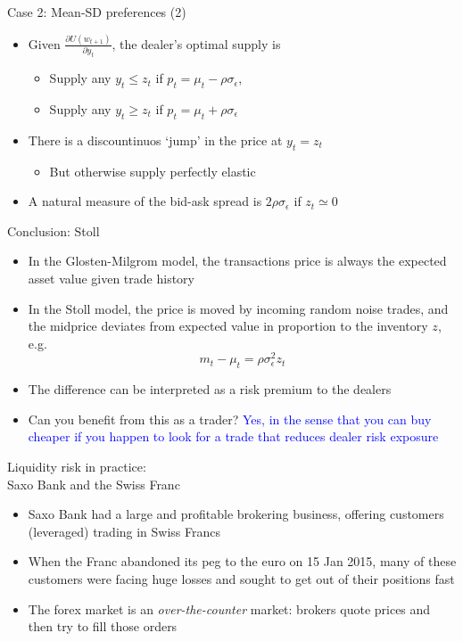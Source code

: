 \documentclass[english,10pt]{beamer}
\begin{document}
\begin{frame}{Case 2: Mean-SD preferences (2)}
	\begin{itemize}
		\item Given $\frac{\partial U(w_{t+1})}{\partial y_t}$, the dealer's optimal supply is
		\begin{itemize}
			\item Supply any $y_t \leq z_t$ if $p_t = \mu_t - \rho\sigma_{\epsilon}$,
			\item Supply any $y_t \geq z_t$ if $p_t = \mu_t + \rho\sigma_{\epsilon}$
		\end{itemize}
		\item There is a discountinuos `jump' in the price at $y_t=z_t$
		\begin{itemize}
			\item But otherwise supply perfectly elastic
		\end{itemize}
		\item A natural measure of the bid-ask spread is $2\rho\sigma_{\epsilon}$ if $z_t \simeq 0$
	\end{itemize}
\end{frame}


\begin{frame}{Conclusion: Stoll}
	\begin{itemize}
		\item In the Glosten-Milgrom model, the transactions price is always the expected asset value given trade history
		\item In the Stoll model, the price is moved by incoming random noise trades, and the midprice deviates from expected value in proportion to the inventory $z$, e.g.
		\[
		m_t - \mu_t = \rho \sigma^2_\epsilon z_t
		\]
		\item The difference can be interpreted as a risk premium to the  dealers
		\item Can you benefit from this as a trader? \pause \textcolor{blue}{Yes, in the sense that you can buy cheaper if you happen to look for a trade that reduces dealer risk exposure}
	\end{itemize}
\end{frame}


\begin{frame}{Liquidity risk in practice: \\Saxo Bank and the Swiss Franc}
	\begin{itemize}
		\item Saxo Bank had a  large and profitable brokering business, offering customers (leveraged) trading in Swiss Francs
		\item When the Franc abandoned its peg to the euro on 15 Jan 2015, many of these customers were facing huge losses and sought to get out of their positions fast
		\item The forex market is an \textit{over-the-counter} market: brokers quote prices and then try to fill those orders
	\end{itemize}
\end{frame}
\end{document}
